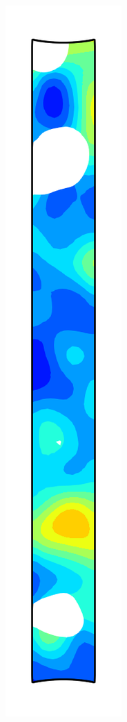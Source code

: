 \begin{figure}[!htb]
\begin{subfigure}{0.08\textwidth}
  \end{subfigure}
  \begin{subfigure}{0.08\textwidth}
    \centering
    \includegraphics[width=\textwidth]{Chapter5/figures/spallation/psie_7}

\end{subfigure}
\end{figure}

